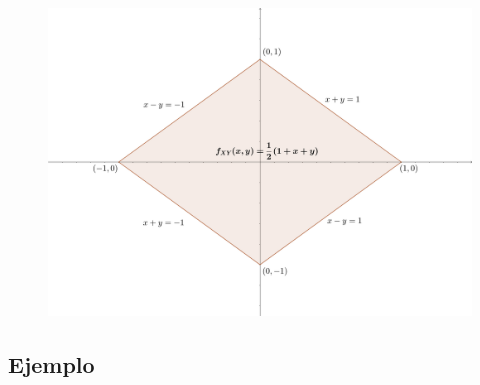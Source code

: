 \documentclass[]{book}
\begin{document}
\begin{figure}
\includegraphics[width=750px]{Images/EjTranLineal} \end{figure}

\hypertarget{ejemplo-75}{%
\subsection{Ejemplo}\label{ejemplo-75}}
\end{document}
